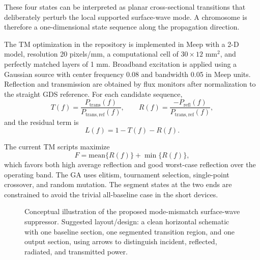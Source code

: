 \documentclass[journal]{IEEEtran}
\begin{document}
These four states can be interpreted as planar cross-sectional transitions that deliberately perturb the local supported surface-wave mode. A chromosome is therefore a one-dimensional state sequence along the propagation direction.

The TM optimization in the repository is implemented in Meep with a 2-D model, resolution 20 pixels/mm, a computational cell of $30 \times 12$ mm$^2$, and perfectly matched layers of 1 mm. Broadband excitation is applied using a Gaussian source with center frequency 0.08 and bandwidth 0.05 in Meep units. Reflection and transmission are obtained by flux monitors after normalization to the straight GDS reference. For each candidate sequence,
\begin{equation}
T(f)=\frac{P_{\mathrm{trans}}(f)}{P_{\mathrm{trans,ref}}(f)},
\qquad
R(f)=\frac{-P_{\mathrm{refl}}(f)}{P_{\mathrm{trans,ref}}(f)},
\end{equation}
and the residual term is
\begin{equation}
L(f)=1-T(f)-R(f).
\end{equation}

The current TM scripts maximize
\begin{equation}
F=\mathrm{mean}\{R(f)\}+\min\{R(f)\},
\end{equation}
which favors both high average reflection and good worst-case reflection over the operating band. The GA uses elitism, tournament selection, single-point crossover, and random mutation. The segment states at the two ends are constrained to avoid the trivial all-baseline case in the short devices.

\begin{figure}[t]
\centering
{}
\caption{Conceptual illustration of the proposed mode-mismatch surface-wave suppressor. Suggested layout/design: a clean horizontal schematic with one baseline section, one segmented transition region, and one output section, using arrows to distinguish incident, reflected, radiated, and transmitted power.}
\label{fig:concept}
\end{figure}
\end{document}
